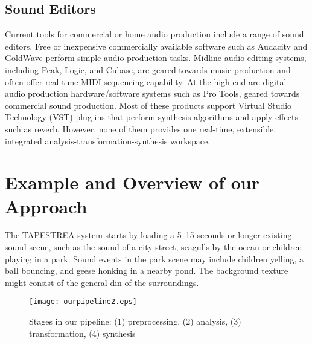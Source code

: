 \documentclass[a4paper]{article}
\begin{document}
\subsection{Sound Editors}

Current tools for commercial or home audio production include a range of sound editors. Free 
or inexpensive commercially available software such as Audacity and GoldWave perform simple 
audio production tasks. Midline audio editing systems, including Peak, Logic, and Cubase, are 
geared towards music production and often offer real-time MIDI sequencing capability. At the 
high end are digital audio production hardware/software systems such as Pro Tools, geared 
towards commercial sound production. Most of these products support Virtual Studio Technology 
(VST) plug-ins that perform synthesis algorithms and apply effects such as reverb. However, 
none of them provides one real-time, extensible, integrated analysis-transformation-synthesis 
workspace.  


\section{Example and Overview of our Approach}

The TAPESTREA system starts by loading a 5--15 seconds or longer existing sound scene, 
such as the sound of a city street, seagulls by the ocean or children playing in a park. 
Sound events in the park scene may include children yelling,  
a ball bouncing, and geese honking in a nearby pond. The background texture might 
consist of the general din of the surroundings. 

\begin{figure}[t]
\centering
\texttt{[image: ourpipeline2.eps]}
\caption{Stages in our pipeline: (1) preprocessing, (2) analysis, (3) transformation, (4) synthesis}
\label{fig:pipeline}
\end{figure}
\end{document}
